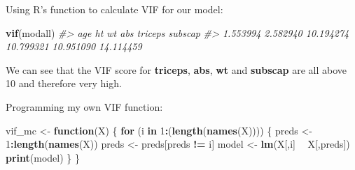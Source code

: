 \documentclass[]{article}
\newenvironment{Shaded}{\begin{snugshade}}{\end{snugshade}}
\newcommand{\CommentTok}[1]{\textcolor[rgb]{0.56,0.35,0.01}{\textit{#1}}}
\newcommand{\ControlFlowTok}[1]{\textcolor[rgb]{0.13,0.29,0.53}{\textbf{#1}}}
\newcommand{\DecValTok}[1]{\textcolor[rgb]{0.00,0.00,0.81}{#1}}
\newcommand{\KeywordTok}[1]{\textcolor[rgb]{0.13,0.29,0.53}{\textbf{#1}}}
\newcommand{\NormalTok}[1]{#1}
\newcommand{\OperatorTok}[1]{\textcolor[rgb]{0.81,0.36,0.00}{\textbf{#1}}}
\newcommand{\StringTok}[1]{\textcolor[rgb]{0.31,0.60,0.02}{#1}}
\begin{document}
Using R's function to calculate VIF for our model:

\begin{Shaded}
\begin{Highlighting}[]
\KeywordTok{vif}\NormalTok{(modall)}
\CommentTok{#>       age        ht        wt       abs   triceps   subscap }
\CommentTok{#>  1.553994  2.582940 10.194274 10.799321 10.951090 14.114459}
\end{Highlighting}
\end{Shaded}

We can see that the VIF score for \textbf{triceps}, \textbf{abs},
\textbf{wt} and \textbf{subscap} are all above 10 and therefore very
high.

Programming my own VIF function:

\begin{Shaded}
\begin{Highlighting}[]
\NormalTok{vif_mc <-}\StringTok{ }\ControlFlowTok{function}\NormalTok{(X) \{}
    \ControlFlowTok{for}\NormalTok{ (i }\ControlFlowTok{in} \DecValTok{1}\OperatorTok{:}\NormalTok{(}\KeywordTok{length}\NormalTok{(}\KeywordTok{names}\NormalTok{(X)))) \{}
\NormalTok{        preds <-}\StringTok{ }\DecValTok{1}\OperatorTok{:}\KeywordTok{length}\NormalTok{(}\KeywordTok{names}\NormalTok{(X))}
\NormalTok{        preds <-}\StringTok{ }\NormalTok{preds[preds }\OperatorTok{!=}\StringTok{ }\NormalTok{i]}
\NormalTok{        model <-}\StringTok{ }\KeywordTok{lm}\NormalTok{(X[,i] }\OperatorTok{~}\StringTok{ }\NormalTok{X[,preds])}
        \KeywordTok{print}\NormalTok{(model)}
\NormalTok{    \}}
\NormalTok{\}}
\end{Highlighting}
\end{Shaded}
\end{document}

